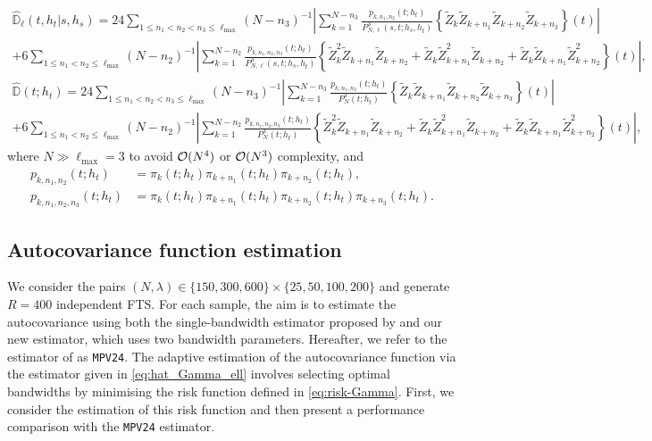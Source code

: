 \begin{multline}
	\widehat{\mathbb{D}}_\ell(t,h_t|s,h_s)  = 24 \!\!\!\!\!\!\!\!\!\!\!\!\!\!\!\!\!\sum_{1\leq n_1<n_2<n_3\leq \ell_{\max}}\!\!\!\!\!\!\!\!\!\!\!\!\!\!\!\!(N - n_3)^{-1}\left|\sum_{k=1}^{N - n_3} \!\! \frac{p_{k,n_1, n_2}(t;h_t)}{P_{N,\ell}^{3}(s, t; h_s, h_t)} \left\{\widetilde{Z}_k \widetilde{Z}_{k + n_1} \widetilde{Z}_{k + n_2} \widetilde{Z}_{k + n_3}\right\}(t) \right| \\
	+ 6 \!\!\!\!\!\!\!\!\!\!\!\!\!\!\sum_{1\leq n_1<n_2\leq \ell_{\max}} \!\!\!\!\!\!\!\!\!\!\!\!\!(N - n_2)^{-1}\left|\sum_{k=1}^{N - n_2} \! \frac{p_{k,n_1, n_2, n_3}(t;h_t)}{P_{N,\ell}^{3}(s, t; h_s, h_t)} \left\{\widetilde{Z}_k^2 \widetilde{Z}_{k + n_1} \widetilde{Z}_{k + n_2} + \widetilde{Z}_k \widetilde{Z}_{k + n_1}^2 \widetilde{Z}_{k + n_2} + \widetilde{Z}_k \widetilde{Z}_{k + n_1} \widetilde{Z}_{k + n_2}^2\right\}(t)\right|,
\end{multline}
\begin{multline}
	\widehat{\mathbb{D}}(t; h_t)  = 24 \!\!\!\!\!\!\!\!\!\!\!\!\!\!\!\!\!\sum_{1\leq n_1<n_2<n_3\leq \ell_{\max}}\!\!\!\!\!\!\!\!\!\!\!\!\!\!\!\!(N - n_3)^{-1}\left|\sum_{k=1}^{N - n_3} \!\! \frac{p_{k,n_1, n_2}(t;h_t)}{P_N^{3}(t; h_t)}\left\{\widetilde{Z}_k \widetilde{Z}_{k + n_1} \widetilde{Z}_{k + n_2} \widetilde{Z}_{k + n_3}\right\}(t) \right| \\ 
	+ 6 \!\!\!\!\!\!\!\!\!\!\!\!\!\!\sum_{1\leq n_1<n_2\leq \ell_{\max}} \!\!\!\!\!\!\!\!\!\!\!\!\!(N - n_2)^{-1}\left|\sum_{k=1}^{N - n_2} \!\frac{p_{k,n_1, n_2, n_3}(t;h_t)}{P_N^{3}(t; h_t)} \left\{\widetilde{Z}_k^2 \widetilde{Z}_{k + n_1} \widetilde{Z}_{k + n_2} + \widetilde{Z}_k \widetilde{Z}_{k + n_1}^2 \widetilde{Z}_{k + n_2} + \widetilde{Z}_k \widetilde{Z}_{k + n_1} \widetilde{Z}_{k + n_2}^2\right\}(t)\right|,
\end{multline}
where $N \gg \ell_{\max} = 3$ to avoid $\mathcal{O}(N^4)$ or $\mathcal{O}(N^3)$ complexity, and 
\begin{align}
	p_{k,n_1, n_2}(t;h_t) &= \pi_k(t;h_t)\pi_{k+n_1}(t;h_t)\pi_{k+n_2}(t;h_t), \\
	p_{k,n_1, n_2, n_3}(t;h_t) &= \pi_k(t;h_t)\pi_{k+n_1}(t;h_t)\pi_{k+n_2}(t;h_t)\pi_{k+n_3}(t;h_t).
\end{align}

\subsection{Autocovariance function estimation}\label{sec:emp_study:autocov}
We consider the pairs $(N, \lambda) \in \{150, 300, 600\} \times \{25, 50, 100, 200\}$ and generate $R = 400$ independent FTS. For each sample, the aim is to estimate the autocovariance using both the single-bandwidth estimator proposed by \cite{Maissoro2025} and our new estimator, which uses two bandwidth parameters. Hereafter, we refer to the estimator of \cite{Maissoro2025} as \texttt{MPV24}. The adaptive estimation of the autocovariance function via the estimator given in \eqref{eq:hat_Gamma_ell} involves selecting optimal bandwidths by minimising the risk function defined in \eqref{eq:risk-Gamma}. First, we consider the estimation of this risk function and then present a performance comparison with \color{magenta}the \texttt{MPV24} estimator\color{black}.


